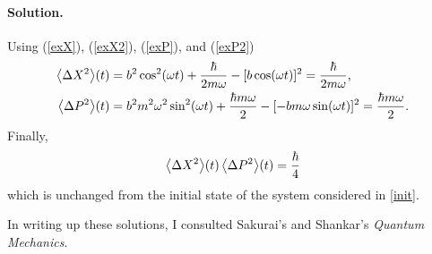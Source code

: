 \documentclass[11pt]{article}
\newcommand{\refeq}[1]{(\ref{#1})}
\newenvironment{solution}
{
    \paragraph{Solution.}
    \ignorespaces
}
{
}
\begin{document}
\begin{solution}
	Using \refeq{exX}, \refeq{exX2}, \refeq{exP}, and \refeq{exP2}
	\begin{align}
		\evDXqt &= b^2 \cosqwt + \frac{\hbar}{2 m \omega} - [b \coswt]^2 = \frac{\hbar}{2 m \omega}, \\
		\evDPqt &= b^2 m^2 \omega^2 \sinqwt + \frac{\hbar m \omega}{2} - [-b m \omega \sinwt]^2 = \frac{\hbar m \omega}{2}.
	\end{align}
	Finally,
	\begin{equation}
		\evDXqt \evDPqt = \frac{\hbar}{4}
	\end{equation}
	which is unchanged from the initial state of the system considered in \ref{init}.
\end{solution}

In writing up these solutions, I consulted Sakurai's and Shankar's \emph{Quantum Mechanics}.
\end{document}
